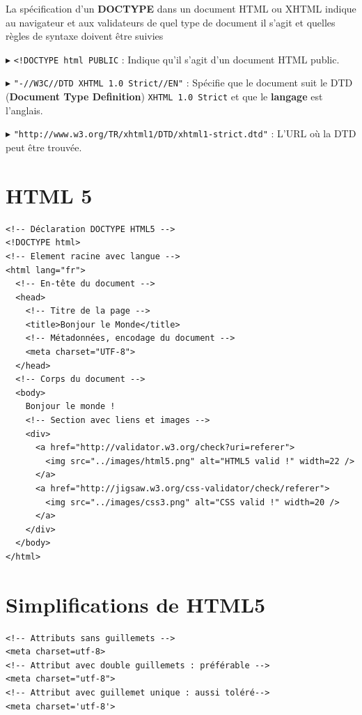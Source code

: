 \documentclass{report}
\begin{document}
\begin{multicols*}{2}
\begin{note}{}{}
La spécification d'un \textbf{DOCTYPE} dans un document HTML ou XHTML indique 
au navigateur et aux validateurs de quel type de document il s'agit et quelles règles de syntaxe 
doivent être suivies   
\end{note}
$\blacktriangleright$ \texttt{<!DOCTYPE html PUBLIC} : Indique qu'il s'agit d'un document HTML public.

\vspace{0.5cm}

$\blacktriangleright$ \texttt{"-//W3C//DTD XHTML 1.0 Strict//EN"} : Spécifie que le document suit le DTD (\textbf{Document Type Definition}) \texttt{XHTML 1.0 Strict} et que le \textbf{langage} est l'anglais.

\vspace{0.5cm}

$\blacktriangleright$ \texttt{"http://www.w3.org/TR/xhtml1/DTD/xhtml1-strict.dtd"} : L'URL où la DTD peut être trouvée.



\section{HTML 5}

\begin{lstlisting}[style=HTMLDraculaDark]
<!-- Déclaration DOCTYPE HTML5 -->
<!DOCTYPE html>
<!-- Element racine avec langue -->
<html lang="fr">
  <!-- En-tête du document -->
  <head>
    <!-- Titre de la page -->
    <title>Bonjour le Monde</title>
    <!-- Métadonnées, encodage du document -->
    <meta charset="UTF-8">
  </head>
  <!-- Corps du document -->
  <body>
    Bonjour le monde !
    <!-- Section avec liens et images -->
    <div>
      <a href="http://validator.w3.org/check?uri=referer">
        <img src="../images/html5.png" alt="HTML5 valid !" width=22 />
      </a>
      <a href="http://jigsaw.w3.org/css-validator/check/referer">
        <img src="../images/css3.png" alt="CSS valid !" width=20 />
      </a>
    </div>
  </body>
</html>
\end{lstlisting}

\section{Simplifications de HTML5}

\begin{lstlisting}[style=HTMLDraculaDark]
<!-- Attributs sans guillemets -->
<meta charset=utf-8>
<!-- Attribut avec double guillemets : préférable -->
<meta charset="utf-8">
<!-- Attribut avec guillemet unique : aussi toléré-->
<meta charset='utf-8'>


\end{lstlisting}
\end{multicols*}
\end{document}
